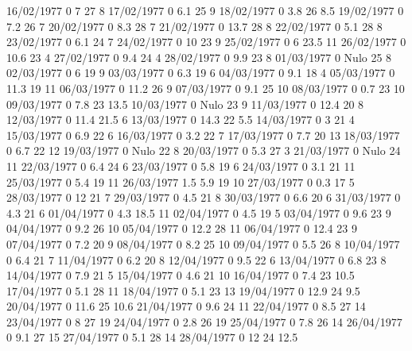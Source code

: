 16/02/1977  0      7      27     8 
17/02/1977  0      6.1    25     9 
18/02/1977  0      3.8    26     8.5 
19/02/1977  0      7.2    26     7 
20/02/1977  0      8.3    28     7 
21/02/1977  0      13.7   28     8 
22/02/1977  0      5.1    28     8 
23/02/1977  0      6.1    24     7 
24/02/1977  0      10     23     9 
25/02/1977  0      6      23.5   11 
26/02/1977  0      10.6   23     4 
27/02/1977  0      9.4    24     4 
28/02/1977  0      9.9    23     8 
01/03/1977  0     Nulo    25     8 
02/03/1977  0      6      19     9 
03/03/1977  0      6.3    19     6 
04/03/1977  0      9.1    18     4 
05/03/1977  0      11.3   19     11 
06/03/1977  0      11.2   26     9 
07/03/1977  0      9.1    25     10 
08/03/1977  0      0.7    23     10 
09/03/1977  0      7.8    23     13.5 
10/03/1977  0     Nulo    23     9 
11/03/1977  0      12.4   20     8 
12/03/1977  0      11.4   21.5   6 
13/03/1977  0      14.3   22     5.5 
14/03/1977  0      3      21     4 
15/03/1977  0      6.9    22     6 
16/03/1977  0      3.2    22     7 
17/03/1977  0      7.7    20     13 
18/03/1977  0      6.7    22     12 
19/03/1977  0     Nulo    22     8 
20/03/1977  0      5.3    27     3 
21/03/1977  0     Nulo    24     11 
22/03/1977  0      6.4    24     6 
23/03/1977  0      5.8    19     6 
24/03/1977  0      3.1    21     11 
25/03/1977  0      5.4    19     11 
26/03/1977  1.5    5.9    19     10 
27/03/1977  0      0.3    17     5 
28/03/1977  0      12     21     7 
29/03/1977  0      4.5    21     8 
30/03/1977  0      6.6    20     6 
31/03/1977  0      4.3    21     6 
01/04/1977  0      4.3    18.5   11 
02/04/1977  0      4.5    19     5 
03/04/1977  0      9.6    23     9 
04/04/1977  0      9.2    26     10 
05/04/1977  0      12.2   28     11 
06/04/1977  0      12.4   23     9 
07/04/1977  0      7.2    20     9 
08/04/1977  0      8.2    25     10 
09/04/1977  0      5.5    26     8 
10/04/1977  0      6.4    21     7 
11/04/1977  0      6.2    20     8 
12/04/1977  0      9.5    22     6 
13/04/1977  0      6.8    23     8 
14/04/1977  0      7.9    21     5 
15/04/1977  0      4.6    21     10 
16/04/1977  0      7.4    23     10.5 
17/04/1977  0      5.1    28     11 
18/04/1977  0      5.1    23     13 
19/04/1977  0      12.9   24     9.5 
20/04/1977  0      11.6   25     10.6 
21/04/1977  0      9.6    24     11 
22/04/1977  0      8.5    27     14 
23/04/1977  0      8      27     19 
24/04/1977  0      2.8    26     19 
25/04/1977  0      7.8    26     14 
26/04/1977  0      9.1    27     15 
27/04/1977  0      5.1    28     14 
28/04/1977  0      12     24     12.5 
